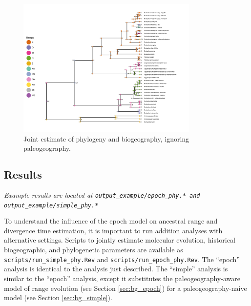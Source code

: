 \begin{figure}[!h]
\centering
\includegraphics[width=0.8\textwidth]{figures/fig_simple_phy_RevGadgets_ase.pdf}
\caption{Joint estimate of phylogeny and biogeography, ignoring paleogeography.}
\label{fig:simple_phy}
\end{figure}

\subsection{Results}

\begin{center}
{\it Example results are located at \tt{output\_example/epoch\_phy.*} and \tt{output\_example/simple\_phy.*} }
\end{center}

To understand the influence of the epoch model on ancestral range and divergence time estimation, it is important to run addition analyses with alternative settings.
Scripts to jointly estimate molecular evolution, historical biogeographic, and phylogenetic parameters are available as {\tt scripts/run\_simple\_phy.Rev} and {\tt scripts/run\_epoch\_phy.Rev}.
The ``epoch'' analysis is identical to the analysis just described.
The ``simple'' analysis is similar to the ``epoch'' analysis, except it substitutes the paleogeography-aware model of range evolution (see Section \ref{sec:bg_epoch}) for a paleogeography-naive model (see Section \ref{sec:bg_simple}).

